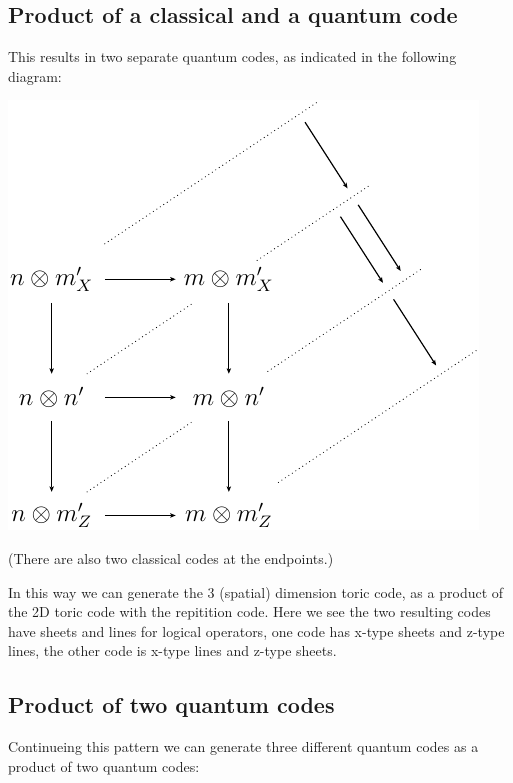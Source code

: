 \subsection{Product of a classical and a quantum code}

This results in two separate quantum codes, as indicated in
the following diagram:

\begin{center}
\includegraphics{prodcq.pdf}
\end{center}

(There are also two classical codes at the endpoints.)

In this way we can generate the 3 (spatial) dimension toric code,
as a product of the 2D toric code with the repitition code.
Here we see the two resulting codes have sheets and lines for
logical operators, one code has x-type sheets and z-type lines, the
other code is x-type lines and z-type sheets.

\subsection{Product of two quantum codes}

Continueing this pattern we can generate three different
quantum codes as a product of two quantum codes:

